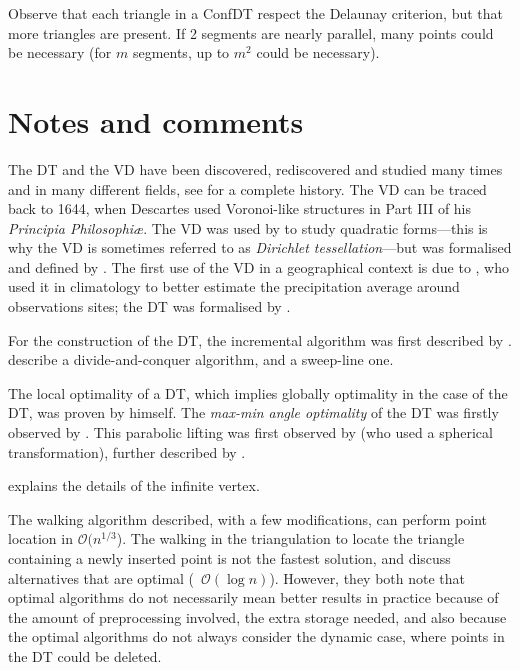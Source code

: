 Observe that each triangle in a ConfDT respect the Delaunay criterion, but that more triangles are present. 
If 2 segments are nearly parallel, many points could be necessary (for $m$ segments, up to $m^2$ could be necessary).


%
\section{Notes and comments}%
\label{sec:notes}

The DT and the VD have been discovered, rediscovered and studied many times and in many different fields, see \citet{Okabe00} for a complete history.
The VD can be traced back to 1644, when Descartes used Voronoi-like structures in Part III of his \emph{Principia Philosophi\ae}. 
The VD was used by \citet{Dirichlet50} to study quadratic forms---this is why the VD is sometimes referred to as \emph{Dirichlet tessellation}---but was formalised and defined by \citet{Voronoi08}. 
The first use of the VD in a geographical context is due to \citet{Thiessen11}, who used it in climatology to better estimate the precipitation average around observations sites; the DT was formalised by \citet{Delaunay34}. 

For the construction of the DT, the incremental algorithm was first described by \citet{Lawson72-1}.
\citet{Guibas85} describe a divide-and-conquer algorithm, and \citet{Fortune87} a sweep-line one.

The local optimality of a DT, which implies globally optimality in the case of the DT, was proven by \citet{Delaunay34} himself.
The \emph{max-min angle optimality} of the DT was firstly observed by \citet{Sibson78}.
This parabolic lifting was first observed by \citet{Brown79} (who used a spherical transformation), further described by \citet{Seidel82,Edelsbrunner86}. 

\citet{Liu05-1} explains the details of the infinite vertex.

The walking algorithm described, with a few modifications, can perform point location in $\mathcal{O}(n^{1/3}$).
The walking in the triangulation to locate the triangle containing a newly inserted point is not the fastest solution, \citet{Mucke99} and \citet{Devillers02} discuss alternatives that are optimal (\ie\ $\mathcal{O}(\log n)$).
However, they both note that optimal algorithms do not necessarily mean better results in practice because of the amount of preprocessing involved, the extra storage needed, and also because the optimal algorithms do not always consider the dynamic case, where points in the DT could be deleted. 

